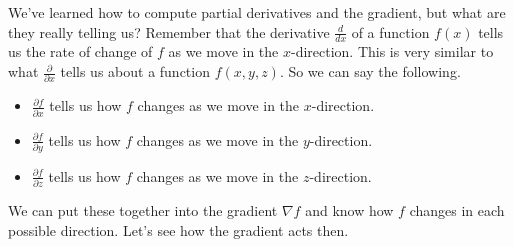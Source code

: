         We've learned how to compute partial derivatives and the gradient, but what are they really telling us? Remember that the derivative $\frac{d}{dx}$ of a function $f(x)$ tells us the rate of change of $f$ as we move in the $x$-direction.  This is very similar to what $\frac{\partial}{\partial x}$ tells us about a function $f(x,y,z)$.  So we can say the following.
        \begin{itemize}
            \item $\frac{\partial f}{\partial x}$ tells us how $f$ changes as we move in the $x$-direction.
            \item $\frac{\partial f}{\partial y}$ tells us how $f$ changes as we move in the $y$-direction.
            \item $\frac{\partial f}{\partial z}$ tells us how $f$ changes as we move in the $z$-direction.
        \end{itemize}
        
        We can put these together into the gradient $\nabla f$ and know how $f$ changes in each possible direction. Let's see how the gradient acts then. 
        
